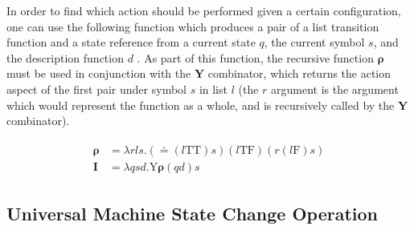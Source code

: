 \documentclass[Master.tex]{subfiles}
\begin{document}


In order to find which action should be performed given a certain configuration, one can use the following function which produces a pair of a list transition function and a state reference from a current state $q$, the current symbol $s$, and the description function $d$
. As part of this function, the recursive function $\bm{\rho}$ must be used in conjunction with the \textbf{Y} combinator, which returns the action aspect of the first pair under symbol $s$ in list $l$ (the $r$ argument is the argument which would represent the function as a whole, and is recursively called by the \textbf{Y} combinator).

\begin{gather*}
\begin{aligned}
\bm{\rho} &= \lambda rls.(\bm{\doteq}(l\bm{\mathrm{TT}})s)(l\bm{\mathrm{TF}})(r(l\bm{\mathrm{F}})s)\\
\bm{I} &= \lambda qsd.\bm{\mathrm{Y}\rho}(qd)s
\end{aligned}
\end{gather*}

\subsection{Universal Machine State Change Operation}
\end{document}
